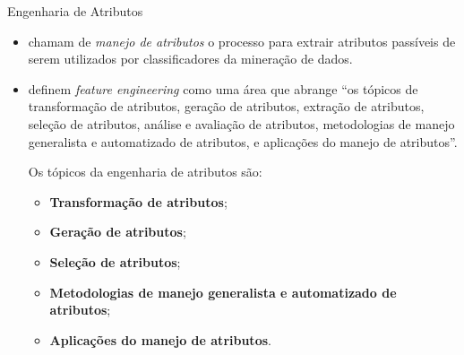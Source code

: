 \documentclass[%
  10pt,%
  aspectratio = 169,%
  compress,%
  t,%
]{beamer}%
\begin{document}
    \begin{frame}[fragile = singleslide]{}{Engenharia de Atributos}
        \begin{itemize}
            \item \cite{ZhengFEML2018} chamam de \textit{manejo de atributos} o processo para extrair atributos passíveis de serem utilizados por classificadores da mineração de dados.

            \item \cite[p.~3, tradução nossa]{DongFEMLDA2018} definem \textit{feature engineering} como uma área que abrange ``os tópicos de transformação de atributos, geração de atributos, extração de atributos, seleção de atributos, análise e avaliação de atributos, metodologias de manejo generalista e automatizado de atributos, e aplicações do manejo de atributos''.

            Os tópicos da engenharia de atributos são:
            \begin{itemize}
                \item \textbf{Transformação de atributos};

                \item \textbf{Geração de atributos};

                \item \textbf{Seleção de atributos};

                \item \textbf{Metodologias de manejo generalista e automatizado de atributos};

                \item \textbf{Aplicações do manejo de atributos}.
            \end{itemize}
        \end{itemize}

    \end{frame}
\end{document}
